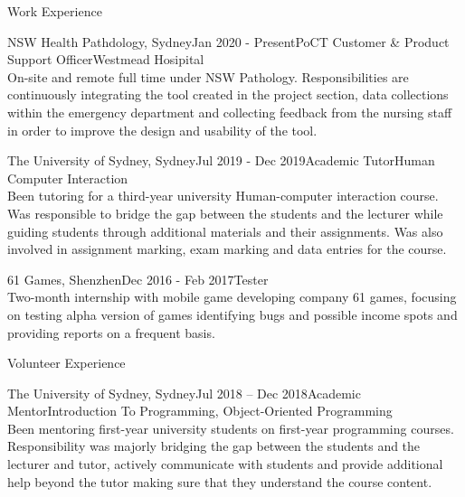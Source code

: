 \documentclass{resume} %
\begin{document}
\begin{rSection}{Work Experience}

\begin{rSubsection}
{NSW Health Pathdology, Sydney}{Jan 2020 - Present}{PoCT Customer & Product Support Officer}{Westmead Hosipital}
\\ On-site and remote full time under NSW Pathology. Responsibilities are continuously integrating the tool created in the project section, data collections within the emergency department and collecting feedback from the nursing staff in order to improve the design and usability of the tool.\\ 
\end{rSubsection}
\begin{rSubsection}
{The University of Sydney, Sydney}{Jul 2019 - Dec 2019}{Academic Tutor}{Human Computer Interaction}
\\ Been tutoring for a third-year university Human-computer interaction course. Was responsible to bridge the gap between the students and the lecturer while guiding students through additional materials and their assignments. Was also involved in assignment marking, exam marking and data entries for the course.\\ 
\end{rSubsection}
\pagebreak
\begin{rSubsection}
{61 Games, Shenzhen}{Dec 2016 - Feb 2017}{Tester}{}
\\ Two-month internship with mobile game developing company 61 games, focusing on testing alpha version of games identifying bugs and possible income spots and providing reports on a frequent basis.\\ 
\end{rSubsection}

\end{rSection}


\begin{rSection}{Volunteer Experience}
\begin{rSubsection}
{The University of Sydney, Sydney}{Jul 2018 – Dec 2018}{Academic Mentor}{Introduction To Programming, Object-Oriented Programming}
\\ Been mentoring first-year university students on first-year programming courses. Responsibility was majorly bridging the gap between the students and the lecturer and tutor, actively communicate with students and provide additional help beyond the tutor making sure that they understand the course content.\\ 
\end{rSubsection}

\end{rSection}
\end{document}
